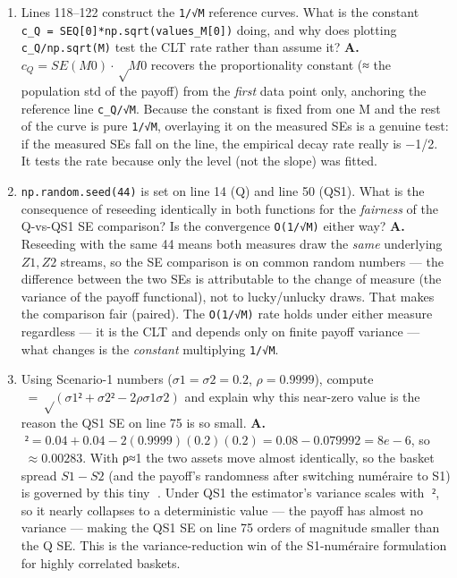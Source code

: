 \documentclass[
  11pt,
]{article}
\begin{document}
\begin{enumerate}
  \(ddof=0\)? \textbf{A.} They return \(V_aprox = mean(V)\) (the MC
  price estimator) and \texttt{SE\_aprox\ =\ std(V,\ ddof=1)/√M} (its
  standard error). \(ddof=1\) gives the unbiased sample variance (divide
  by \(M−1\)), which is the correct estimator of the population variance
  feeding the CLT-based SE. \(ddof=0\) divides by \(M\), slightly
  underestimating the variance and hence the SE; for the large M here
  (10k--100k) the difference is negligible (\textasciitilde factor
  √(M/(M−1)) ≈ 1), but ddof=1 is the principled choice.
\item
  Lines 118--122 construct the \texttt{1/√M} reference curves. What is
  the constant \texttt{c\_Q\ =\ SEQ{[}0{]}*np.sqrt(values\_M{[}0{]})}
  doing, and why does plotting \texttt{c\_Q/np.sqrt(M)} test the CLT
  rate rather than assume it? \textbf{A.} \(c_Q = SE(M0)·√M0\) recovers
  the proportionality constant (≈ the population std of the payoff) from
  the \emph{first} data point only, anchoring the reference line
  \texttt{c\_Q/√M}. Because the constant is fixed from one M and the
  rest of the curve is pure \texttt{1/√M}, overlaying it on the measured
  SEs is a genuine test: if the measured SEs fall on the line, the
  empirical decay rate really is −1/2. It tests the rate because only
  the level (not the slope) was fitted.
\item
  \texttt{np.random.seed(44)} is set on line 14 (Q) and line 50 (QS1).
  What is the consequence of reseeding identically in both functions for
  the \emph{fairness} of the Q-vs-QS1 SE comparison? Is the convergence
  \texttt{O(1/√M)} either way? \textbf{A.} Reseeding with the same 44
  means both measures draw the \emph{same} underlying \(Z1, Z2\)
  streams, so the SE comparison is on common random numbers --- the
  difference between the two SEs is attributable to the change of
  measure (the variance of the payoff functional), not to lucky/unlucky
  draws. That makes the comparison fair (paired). The \texttt{O(1/√M)}
  rate holds under either measure regardless --- it is the CLT and
  depends only on finite payoff variance --- what changes is the
  \emph{constant} multiplying \texttt{1/√M}.
\item
  Using Scenario-1 numbers (\(σ1=σ2=0.2\), \(ρ=0.9999\)), compute
  \( = √(σ1²+σ2²−2ρσ1σ2)\) and explain why this near-zero value is the
  reason the QS1 SE on line 75 is so small. \textbf{A.}
  \(² = 0.04 + 0.04 − 2(0.9999)(0.2)(0.2) = 0.08 − 0.079992 = 8e-6\),
  so \( ≈ 0.00283\). With ρ≈1 the two assets move almost identically,
  so the basket spread \(S1−S2\) (and the payoff's randomness after
  switching numéraire to S1) is governed by this tiny \(\). Under QS1
  the estimator's variance scales with \(²\), so it nearly collapses to
  a deterministic value --- the payoff has almost no variance --- making
  the QS1 SE on line 75 orders of magnitude smaller than the Q SE. This
  is the variance-reduction win of the S1-numéraire formulation for
  highly correlated baskets.
\end{enumerate}
\end{document}
